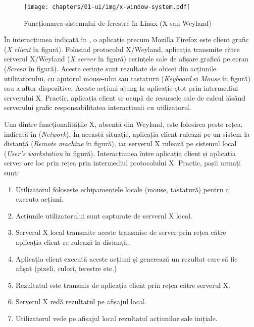 \begin{figure}[htbp]
  \centering
  \texttt{[image: chapters/01-ui/img/x-window-system.pdf]}
  \caption{Funcționarea sistemului de ferestre în Linux (X sau Weyland)}
  \label{fig:ui:x-window-system}
\end{figure}

În interacțiunea indicată în , o aplicație precum Mozilla Firefox este client grafic (\textit{X client} în figură). Folosind protocolul X/Weyland, aplicația transmite către serverul X/Weyland (\textit{X server} în figură) cerințele sale de afișare grafică pe ecran (\textit{Screen} în figură). Aceste cerințe sunt rezultate de obicei din acțiunile utilizatorului, cu ajutorul mouse-ului sau tastaturii (\textit{Keyboard} și \textit{Mouse} în figură) sau a altor dispozitive. Aceste acțiuni ajung la aplicație ștot prin intermediul serverului X. Practic, aplicația client se ocupă de resursele sale de calcul lăsând serverului grafic responsabilitatea interacțiunii cu utilizatorul.

Una dintre funcționalitățile X, absentă din Weyland, este folosirea peste rețea, indicată în  (\textit{Network}). În această situație, aplicația client rulează pe un sistem la distanță (\textit{Remote machine} în figură), iar serverul X rulează pe sistemul local (\textit{User's workstation} în figură). Interacțiunea între aplicația client și aplicația server are loc prin rețea prin intermediul protocolului X. Practic, pașii urmați sunt:
\begin{enumerate}
  \item Utilizatorul folosește echipamentele locale (mouse, tastatură) pentru a executa acțiuni.
  \item Acțiunile utilizatorului sunt capturate de serverul X local.
  \item Serverul X local transmite aceste transmise de server prin rețea către aplicația client ce rulează la distanță.
  \item Aplicația client execută aceste acțiuni și generează un rezultat care să fie afișat (pixeli, culori, ferestre etc.)
  \item Rezultatul este transmis de aplicația client prin rețea către serverul X.
  \item Serverul X redă rezultatul pe afișajul local.
  \item Utilizatorul vede pe afișajul local rezultatul acțiunilor sale inițiale.
\end{enumerate}

